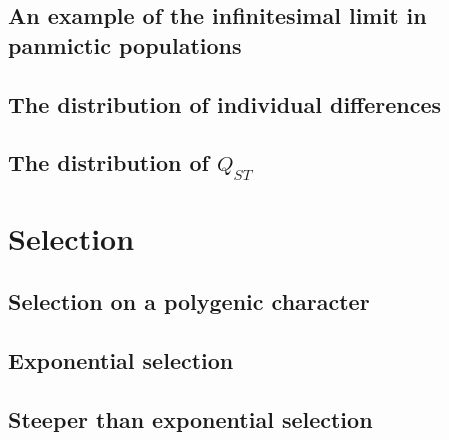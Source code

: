 \documentclass{article}
\begin{document}
\subsection{An example of the infinitesimal limit in panmictic populations}

\subsection{The distribution of individual differences}

\subsection{The distribution of $Q_{ST}$}

\section{Selection}
\subsection{Selection on a polygenic character}

\subsection{Exponential selection}

\subsection{Steeper than exponential selection}


\clearpage


\end{document}
